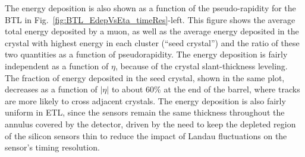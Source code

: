 The energy deposition is also shown as a function of the pseudo-rapidity for the BTL in Fig.~\ref{fig:BTL_EdepVsEta_timeRes}-left. 
This figure shows the average total energy deposited by a muon, as well as the average energy deposited in the crystal with highest energy in each cluster (``seed crystal'') and the ratio of these two quantities as a function of pseudorapidity. 
The energy deposition is fairly independent as a function of $\eta$, because of the crystal slant-thickness leveling. The fraction of energy deposited in the seed crystal, shown in the same plot,  decreases as a function of $|\eta|$ to about 60\% at the end of the barrel, where tracks are more likely to cross adjacent crystals. The energy deposition is also fairly uniform in ETL, since the sensors remain the same thickness throughout the annulus covered by the detector, driven by the need to keep the
depleted region of the silicon sensors thin to reduce the impact of
Landau fluctuations on the sensor's timing resolution.

